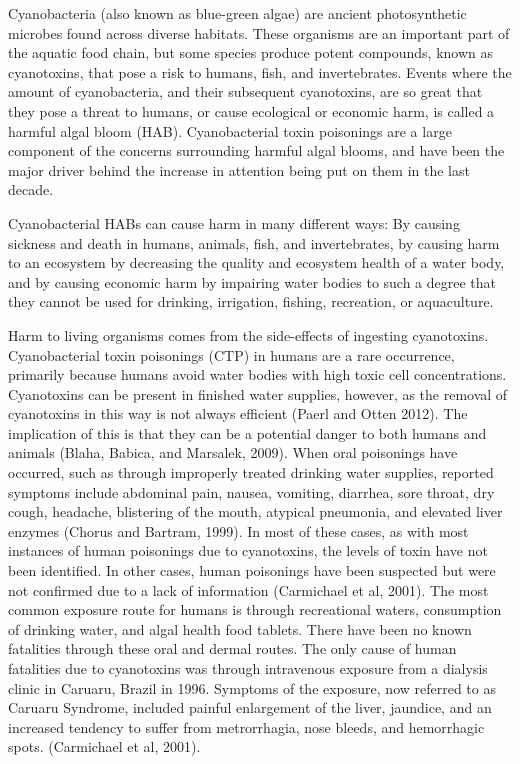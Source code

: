 \documentclass[11pt,]{article}
\begin{document}
Cyanobacteria (also known as blue-green algae) are ancient
photosynthetic microbes found across diverse habitats. These organisms
are an important part of the aquatic food chain, but some species
produce potent compounds, known as cyanotoxins, that pose a risk to
humans, fish, and invertebrates. Events where the amount of
cyanobacteria, and their subsequent cyanotoxins, are so great that they
pose a threat to humans, or cause ecological or economic harm, is called
a harmful algal bloom (HAB). Cyanobacterial toxin poisonings are a large
component of the concerns surrounding harmful algal blooms, and have
been the major driver behind the increase in attention being put on them
in the last decade.

Cyanobacterial HABs can cause harm in many different ways: By causing
sickness and death in humans, animals, fish, and invertebrates, by
causing harm to an ecosystem by decreasing the quality and ecosystem
health of a water body, and by causing economic harm by impairing water
bodies to such a degree that they cannot be used for drinking,
irrigation, fishing, recreation, or aquaculture.

Harm to living organisms comes from the side-effects of ingesting
cyanotoxins. Cyanobacterial toxin poisonings (CTP) in humans are a rare
occurrence, primarily because humans avoid water bodies with high toxic
cell concentrations. Cyanotoxins can be present in finished water
supplies, however, as the removal of cyanotoxins in this way is not
always efficient (Paerl and Otten 2012). The implication of this is that
they can be a potential danger to both humans and animals (Blaha,
Babica, and Marsalek, 2009). When oral poisonings have occurred, such as
through improperly treated drinking water supplies, reported symptoms
include abdominal pain, nausea, vomiting, diarrhea, sore throat, dry
cough, headache, blistering of the mouth, atypical pneumonia, and
elevated liver enzymes (Chorus and Bartram, 1999). In most of these
cases, as with most instances of human poisonings due to cyanotoxins,
the levels of toxin have not been identified. In other cases, human
poisonings have been suspected but were not confirmed due to a lack of
information (Carmichael et al, 2001). The most common exposure route for
humans is through recreational waters, consumption of drinking water,
and algal health food tablets. There have been no known fatalities
through these oral and dermal routes. The only cause of human fatalities
due to cyanotoxins was through intravenous exposure from a dialysis
clinic in Caruaru, Brazil in 1996. Symptoms of the exposure, now
referred to as Caruaru Syndrome, included painful enlargement of the
liver, jaundice, and an increased tendency to suffer from metrorrhagia,
nose bleeds, and hemorrhagic spots. (Carmichael et al, 2001).
\end{document}
